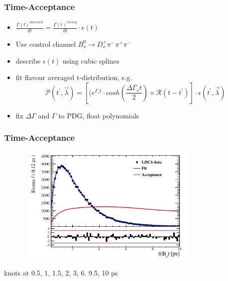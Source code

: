 \documentclass[]{beamer}
\begin{document}
\begin{frame}
\frametitle{Time-Acceptance}


\begin{itemize}

\item $\frac{\Gamma(t)^{observed}}{dt} = \frac{\Gamma(t)^{theory}}{dt} \cdot \epsilon(t)$

\item Use control channel $B_{s}^{0}\to D_{s}^{+}\pi^{-}\pi^{+}\pi^{-}$ 

\item describe $\epsilon(t)$ using cubic splines

\item fit flavour averaged t-distribution, e.g. \[\mathcal{P}(t^{'},\vec{\lambda}) = \left[ (e^{\Gamma_{s}t}\cdot cosh(\frac{\Delta\Gamma_{s}t}{2}) \times \mathcal{R}(t - t^{'})\right] \cdot \epsilon(t^{'}, \vec{\lambda})\]

\item fix $\Delta\Gamma$ and $\Gamma$ to PDG, float polynomials

\end{itemize} 

\end{frame}


\begin{frame}
\frametitle{Time-Acceptance}

\begin{figure}[h]
\includegraphics[width=0.8\textwidth,height=5.7cm]{plots/timeAccFit_test.pdf}
\end{figure}

knots at 0.5, 1, 1.5, 2, 3, 6. 9.5, 10 ps

\end{frame}
\end{document}
